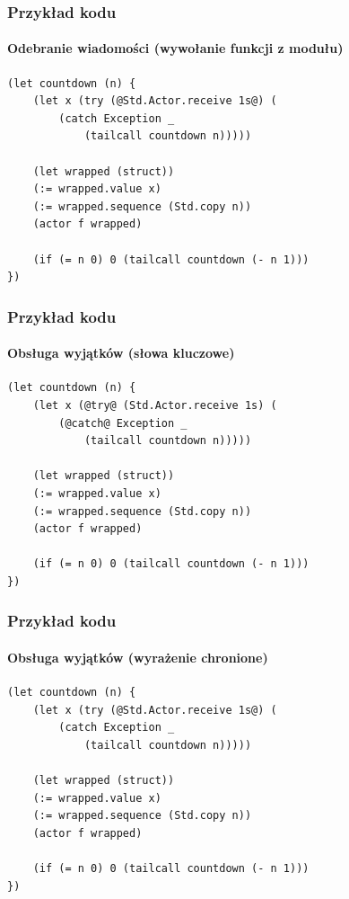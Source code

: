 \documentclass[aspectratio=169]{beamer}
\begin{document}
\begin{frame}[fragile]
    \frametitle{Przykład kodu}
    \framesubtitle{Odebranie wiadomości (wywołanie funkcji z modułu)}

    \begin{small}
    \begin{lstlisting}
(let countdown (n) {
    (let x (try (@Std.Actor.receive 1s@) (
        (catch Exception _
            (tailcall countdown n)))))

    (let wrapped (struct))
    (:= wrapped.value x)
    (:= wrapped.sequence (Std.copy n))
    (actor f wrapped)

    (if (= n 0) 0 (tailcall countdown (- n 1)))
})
    \end{lstlisting}
    \end{small}
\end{frame}

\begin{frame}[fragile]
    \frametitle{Przykład kodu}
    \framesubtitle{Obsługa wyjątków (słowa kluczowe)}

    \begin{small}
    \begin{lstlisting}
(let countdown (n) {
    (let x (@try@ (Std.Actor.receive 1s) (
        (@catch@ Exception _
            (tailcall countdown n)))))

    (let wrapped (struct))
    (:= wrapped.value x)
    (:= wrapped.sequence (Std.copy n))
    (actor f wrapped)

    (if (= n 0) 0 (tailcall countdown (- n 1)))
})
    \end{lstlisting}
    \end{small}
\end{frame}

\begin{frame}[fragile]
    \frametitle{Przykład kodu}
    \framesubtitle{Obsługa wyjątków (wyrażenie chronione)}

    \begin{small}
    \begin{lstlisting}
(let countdown (n) {
    (let x (try (@Std.Actor.receive 1s@) (
        (catch Exception _
            (tailcall countdown n)))))

    (let wrapped (struct))
    (:= wrapped.value x)
    (:= wrapped.sequence (Std.copy n))
    (actor f wrapped)

    (if (= n 0) 0 (tailcall countdown (- n 1)))
})
    \end{lstlisting}
    \end{small}
\end{frame}
\end{document}
